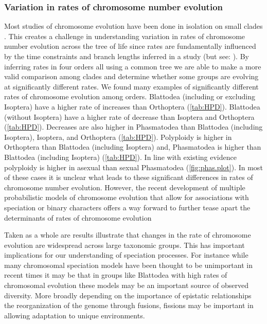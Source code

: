 \subsubsection{Variation in rates of chromosome number evolution}
Most studies of chromosome evolution have been done in isolation on small clades \citep{rockman2002, mccann2016, deoliveira}. 
This creates a challenge in understanding variation in rates of chromosome number evolution across the tree of life since rates are fundamentally influenced by the time constraints and branch lengths inferred in a study (but see: \citealt{blackmon2019meiotic, zenil2017}).
By inferring rates in four orders all using a common tree we are able to make a more valid comparison among clades and determine whether some groups are evolving at significantly different rates.
We found many examples of significantly different rates of chromosome evolution among orders.
Blattodea (including or excluding Isoptera) have a higher rate of increases than Orthoptera (\cref{tab:HPD}).
Blattodea (without Isoptera) have a higher rate of decrease than Isoptera and Orthoptera  (\cref{tab:HPD}).
Decreases are also higher in Phasmatodea than Blattodea (including Isoptera), Isoptera, and Orthoptera  (\cref{tab:HPD}).
Polyploidy is higher in Orthoptera than Blattodea (including Isoptera) and, Phasmatodea is higher than Blattodea (including Isoptera)  (\cref{tab:HPD}).
In line with existing evidence \citep{lokki1980polyploidy, blackmon2016} polyploidy is higher in asexual than sexual Phasmatodea (\cref{fig:phas.plot}).
In most of these cases it is unclear what leads to these significant differences in rates of chromosome number evolution.
However, the recent development of multiple probabilistic models of chromosome evolution that allow for associations with speciation or binary characters offers a way forward to further tease apart the determinants of rates of chromosome evolution \citep{freyman2018, zenil2018chromploid, blackmon2019meiotic}

Taken as a whole are results illustrate that changes in the rate of chromosome evolution are widespread across large taxonomic groups.
This has important implications for our understanding of speciation processes.
For instance while many chromosomal speciation models \citep{baker1986, white} have been thought to be unimportant in recent times it may be that in groups like Blattodea with high rates of chromosomal evolution these models may be an important source of observed diversity.
More broadly depending on the importance of epistatic relationships the reorganization of the genome through fusions, fissions may be important in allowing adaptation to unique environments.

